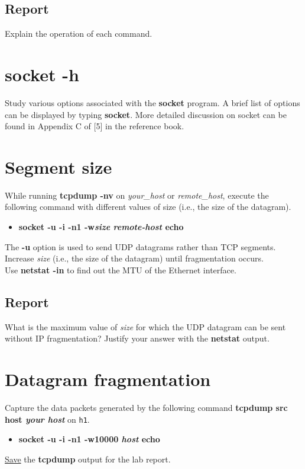 \documentclass{../UTNetLab}
\begin{document}
	\subsection*{Report}
	Explain the operation of each command.

\section{socket -h}
	Study various options associated with the \textbf{socket} program.
	A brief list of options can be displayed by typing \textbf{socket}. More detailed discussion on socket can be found in
	Appendix C of [5] in the reference book.

\section{Segment size}
	While running \textbf{tcpdump -nv} on \textit{your\_host} or \textit{remote\_host}, execute the following command with different values of size (i.e., the size of the datagram). \\
	\begin{itemize}
		\item \textbf{socket -u -i -n1 -w\textit{size} \textit{remote-host} echo}
	\end{itemize}
	The \textbf{-u} option is used to send UDP datagrams rather than TCP segments. \\
	Increase \textit{size} (i.e., the size of the datagram) until fragmentation occurs. \\
	Use \textbf{netstat -in} to find out the MTU of the Ethernet interface.

	\subsection*{Report}
	What is the maximum value of \textit{size} for which the UDP datagram can be sent without IP fragmentation?
	Justify your answer with the \textbf{netstat} output.

\section{Datagram fragmentation}
	Capture the data packets generated by the following command \textbf{tcpdump src host \textit{your host}} on \texttt{h1}. \\
	\begin{itemize}
		\item \textbf{socket -u -i -n1 -w10000 \textit{host} echo}
	\end{itemize}
	\underline{Save} the \textbf{tcpdump} output for the lab report.
\end{document}
